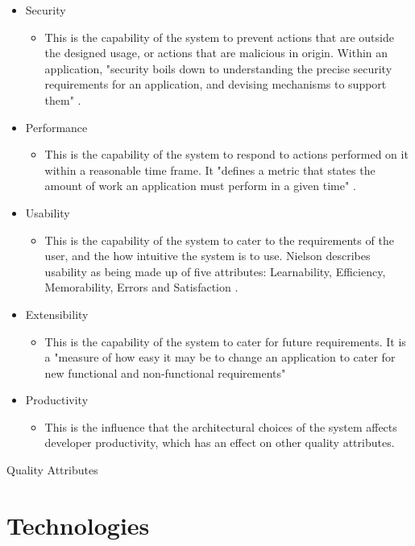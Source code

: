 \begin{itemize}
\item Security
\begin{itemize}
\item This is the capability of the system to prevent actions that are outside the designed usage, or actions that are malicious in origin. Within an application, "security boils down to understanding the precise security requirements for an application, and devising mechanisms to support them" \parencite{gorton2006essential}.
\end{itemize}
\item Performance
\begin{itemize}
\item This is the capability of the system to respond to actions performed on it within a reasonable time frame. It "defines a metric that states the amount of work an application must perform in a given time" \parencite{gorton2006essential}.
\end{itemize}
\item Usability
\begin{itemize}
\item This is the capability of the system to cater to the requirements of the user, and the how intuitive the system is to use. Nielson describes usability as being made up of five attributes: Learnability, Efficiency, Memorability, Errors and Satisfaction \parencite{usability}.
\end{itemize}
\item Extensibility
\begin{itemize}
\item This is the capability of the system to cater for future requirements. It is a "measure of how easy it may be to change an application to cater for new functional and non-functional requirements" \parencite{gorton2006essential}
\end{itemize}
\item Productivity
\begin{itemize}
\item This is the influence that the architectural choices of the system affects developer productivity, which has an effect on other quality attributes.
\end{itemize}
\end{itemize}
\begin{table}[H]
\caption{Quality Attributes}
\label{fig:qualityAttributes}
\end{table}

\section{Technologies}

